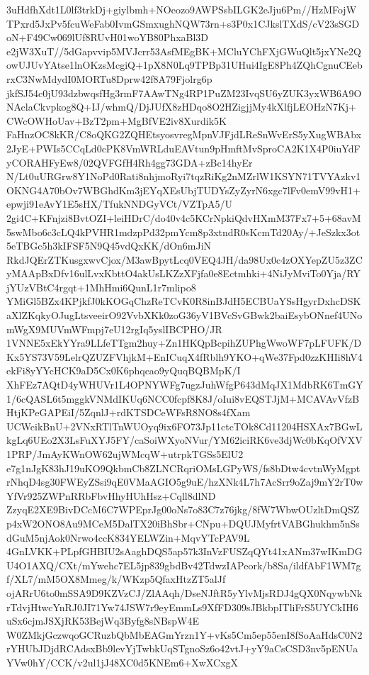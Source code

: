 \documentclass[multi=frame]{standalone}
\begin{document}
\begin{world}
        3uHdfhXdt1L0lf3trkDj+giylbmh+NOeozo9AWPSsbILGK2eJju6Pm//HzMFojWTPxrd5JxPv5fcuWeFab0IvmGSmxughNQW73rn+s3P0x1CJkslTXdS/cV23sSGDoN+F49Cw069lUf8RUvH01woYB80PhxaBl3D
        e2jW3XuT//5dGapvvip5MVJcrr53AsfMEgBK+MCluYChFXjGWuQlt5jxYNe2QowUJUvYAtse1lnOKzsMcgiQ+1pX8N0Lq9TPBp31UHui4IgE8Ph4ZQhCgnuCEebrxC3NwMdydI0MORTu8Dprw42f8A79Fjolrg6p
        jkfSJ54c0jU93dzbwqsfHg3rmF7AAwTNg4RP1PuZM23IvqSU6yZUK3yxWB6A9ONAclaCkvpkog8Q+IJ/whmQ/DjJUfX8zHDqo8O2HZigjjMy4kXlfjLEOHzN7Kj+CWcOWHoUav+BzT2pm+MgBfVE2iv8Xurdik5K
        FaHnzOC8kKR/C8oQKG2ZQHEtsyosvregMpnVJFjdLReSnWvErS5yXugWBAbx2JyE+PWIs5CCqLd0cPK8VmWRLduEAVtun9pHmftMvSproCA2K1X4P0iuYdFyCORAHFyEw8/02QVFGfH4Rh4gg73GDA+zBc14hyEr
        N/Lt0uURGrw8Y1NoPd0Rati8nhjmoRyi7tqzRiKg2nMZrlW1KSYN71TVYAzkv1OKNG4A70bOv7WBGhdKm3jEYqXEsUbjTUDYsZyZyrN6xgc7lFv0emV99vH1+epwji91eAvY1E5sHX/TfukNNDGyVCt/VZTpA5/U
        2gi4C+KFnjzi8BvtOZI+leiHDrC/do40v4c5KCrNpkiQdvHXmM37Fx7+5+68avM5swMbo6c3cLQ4kPVHR1mdzpPd32pmYcm8p3xtndR0sKcmTd20Ay/+JeSzkx3ot5eTBGc5h3kIFSF5N9Q45vdQxKK/dOn6mJiN
        RkdJQErZTKusgxwvCjox/M3awBpytLcq0VEQ4JH/da98Ux0c4zOXYepZU5z3ZCyMAApBxDfv16ulLvxKbttO4akUsLKZzXFjfa0e8Ectmhki+4NiJyMviTo0Yja/RYjYUzVBtC4rgqt+1MhHmi6QunL1r7mlipo8
        YMiGl5BZx4KPjkfJ0kKOGqChzReTCvK0R8inBJdH5ECBUaYSsHgyrDxhcDSKaXlZKqkyOJugLtsveeirO92VvbXKk0zoG36yV1BVcSvGBwk2baiEsybONnef4UNomWgX9MUVmWFmpj7eU12rgIq5yslIBCPHO/JR
        1VNNE5xEkYYra9LLfeTTgm2huy+Zn1HKQpBcpihZUPhgWwoWF7pLFUFK/DKx5YS73V59LelrQZUZFVhjkM+EnICuqX4fRblh9YKO+qWe37Fpd0zzKHIi8hV4ekFi8yYYcHCK9aD5Cx0K6phqcao9yQuqBQBMpK/I
        XhFEz7AQtD4yWHUVr1L4OPNYWFg7ugzJuhWfgP643dMqJX1MdbRK6TmGY1/6cQASL6t5mggkVNMdIKUq6NCC0fcpf8K8J/oIui8vEQSTJjM+MCAVAvVfzBHtjKPeGAPEiI/5ZqnlJ+rdKTSDCeWFsR8NO8s4fXam
        UCWcikBnU+2VNxRTlTnWUOyq9ix6FO73Jp11ctcTOk8Cd11204HSXAx7BGwLkgLq6UEo2X3LsFuXYJ5FY/caSoiWXyoNVur/YM62iciRK6ve3djWc0bKqOfVXV1PRP/JmAyKWnOW62ujWMcqW+utrpkTGSs5ElU2
        e7g1nJgK83hJ19uKO9QkbmCb8ZLNCRqriOMsLGPyWS/fs8bDtw4cvtnWyMgptrNhqD4sg30FWEyZSsi9qE0VMaAGIO5g9uE/hzXNk4L7h7AcSrr9oZaj9mY2rT0wYfVr925ZWPnRRbFbvHhyHUhHsz+Cqll8dlND
        ZzyqE2XE9BivDCcM6C7WPEprJg00oNs7o83C7z76jkg/8fW7WbwOUzltDmQSZp4xW2ONO8Au9MCeM5DalTX20iBhSbr+CNpu+DQUJMyfrtVABGhukhm5nSsdGuM5njAok0Nrwo4ccK834YELWZin+MqvYTcPAV9L
        4GnLVKK+PLpfGHBIU2sAaghDQS5ap57k3InVzFUSZqQYt41xANm37wIKmDGU4O1AXQ/CXt/mYwehc7EL5jp839gbdBv42TdwzIAPeork/b8Sa/ildfAbF1WM7gf/XL7/mM5OX8Mmeg/k/WKzp5QfaxHtzZT5alJf
        ojARrU6to0mSSA9D9KZVzCJ/ZlAAqh/DseNJftR5yYlvMjsRDJ4gQX0NqywbNkrTdvjHtwcYnRJ0JI71Yw74JSW7r9eyEmmLs9XfFD309sJBkbpITliFrS5UYCkIH6uSx6cjmJSXjRK53BejWq3Byfg8sNBspW4E
        W0ZMkjGczwqoGCRuzbQbMbEAGmYrzn1Y+vKs5Cm5ep55enI8fSoAaHdsC0N2rYHUbJDjdRCAdsxBb9levYjTwbkUqSTgnoSz6o42vtJ+yY9aCsCSD3nv5pENUaYVw0hY/CCK/v2ul1jJ48XC0d5KNEm6+XwXCxgX

\end{world}
\end{document}
